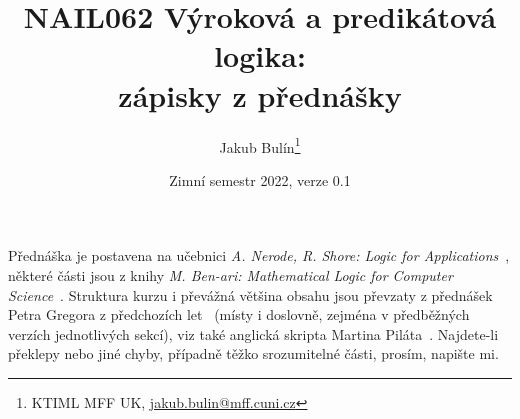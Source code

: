 \title{NAIL062 Výroková a predikátová logika: \\ zápisky z přednášky}
\author{Jakub Bulín\footnote{KTIML MFF UK, \href{mailto://jakub.bulin@mff.cuni.cz}{jakub.bulin@mff.cuni.cz}}}
\date{Zimní semestr 2022, verze 0.1}
\maketitle

Přednáška je postavena na učebnici \emph{A. Nerode, R. Shore: Logic for Applications}~\cite{nerode_logic_2012}, některé části jsou z knihy \emph{M. Ben-ari: Mathematical Logic for Computer Science}~\cite{ben-ari_mathematical_2012}. Struktura kurzu i převážná většina obsahu jsou převzaty z přednášek Petra Gregora z předchozích let~\cite{gregor_vyrokova_nodate} (místy i doslovně, zejména v předběžných verzích jednotlivých sekcí), viz také anglická skripta Martina Piláta~\cite{pilat_lecture_nodate}. Najdete-li překlepy nebo jiné chyby, případně těžko srozumitelné části, prosím, napište mi.

\tableofcontents
